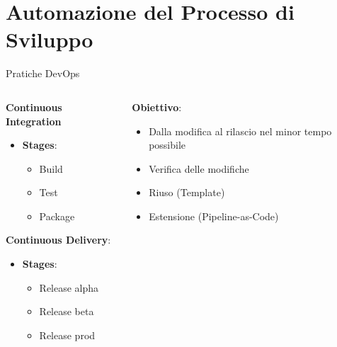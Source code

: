 
\section{Automazione del Processo di Sviluppo}

\begin{frame}{Pratiche DevOps}
    \begin{columns}[onlytextwidth]
        \begin{column}{0.45\textwidth}
    
            \textbf{Continuous Integration}
            \begin{itemize}
                \item \textbf{Stages}:
                \begin{itemize}
                    \item Build
                    \item Test
                    \item Package
                \end{itemize}
            \end{itemize}

            \vspace{4mm}

            \textbf{Continuous Delivery}:
            \begin{itemize}
                \item \textbf{Stages}:
                \begin{itemize}
                    \item Release alpha
                    \item Release beta
                    \item Release prod
                \end{itemize}
            \end{itemize}
            
        \end{column}
        \begin{column}{0.45\textwidth}

            \textbf{Obiettivo}:
            \begin{itemize}
                \item Dalla modifica al rilascio nel minor tempo possibile
                \item Verifica delle modifiche
                \item Riuso (Template)
                \item Estensione (Pipeline-as-Code)
            \end{itemize}
        

\end{column}
\end{columns}
\end{frame}
